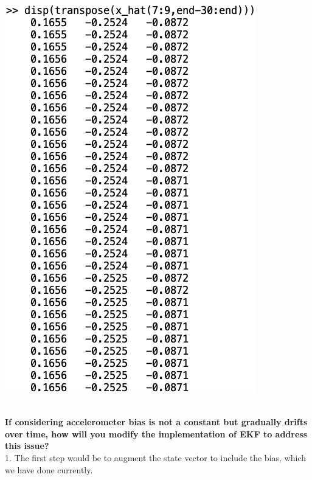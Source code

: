 \begin{minipage}{0.2\textwidth}
    \centering
    \includegraphics[width=1.6\linewidth]{EKF/AC_Bias.png}  
    \label{fig:Bias}
    \captionsetup{justification=centering} %
\end{minipage}\\

\textbf{If considering accelerometer bias is not a constant but gradually drifts over time, how will you modify the implementation of EKF to address this issue?}\\

1. The first step would be to augment the state vector to include the bias, which we have done currently.\\

